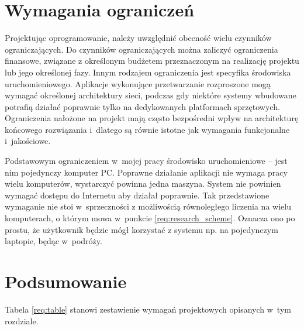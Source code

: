 \documentclass[../thesis.tex]{subfiles}
\begin{document}
\section{Wymagania ograniczeń}

Projektując oprogramowanie, należy uwzględnić obecność wielu czynników ograniczających. Do czynników ograniczających można zaliczyć ograniczenia finansowe, związane z określonym budżetem przeznaczonym na realizację projektu lub jego określonej fazy. Innym rodzajem ograniczenia jest specyfika środowiska uruchomieniowego. Aplikacje wykonujące przetwarzanie rozproszone mogą wymagać określonej architektury sieci, podczas gdy niektóre systemy wbudowane potrafią działać poprawnie tylko na dedykowanych platformach sprzętowych. Ograniczenia nałożone na projekt mają często bezpośredni wpływ na architekturę końcowego rozwiązania i~dlatego są równie istotne jak wymagania funkcjonalne i~jakościowe.

Podstawowym ograniczeniem w~mojej pracy środowisko uruchomieniowe -- jest nim pojedynczy komputer PC. Poprawne działanie aplikacji nie wymaga pracy wielu komputerów, wystarczyć powinna jedna maszyna.  System nie powinien wymagać dostępu do Internetu aby działał poprawnie. Tak przedstawione wymaganie nie stoi w~sprzeczności z możliwością równoległego liczenia na wielu komputerach, o którym mowa w~punkcie \ref{req:research_scheme}. Oznacza ono po prostu, że użytkownik będzie mógł korzystać z systemu np. na pojedynczym laptopie, będąc w~podróży.

\section{Podsumowanie}

Tabela \ref{req:table} stanowi zestawienie wymagań projektowych opisanych w~tym rozdziale.
\end{document}
